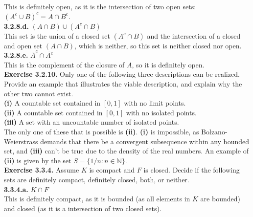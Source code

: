 \documentclass[12pt,letterpaper]{article}
\begin{document}
This is definitely open, as it is the intersection of two open sets: \((A^{c} \cup B)^{c} = A \cap B^{c}\). \\

\textbf{3.2.8.d.} \((A \cap B) \cup (A^{c} \cap B)\) \\

This set is the union of a closed set \((A^{c} \cap B)\) and the intersection of a closed and open set \((A \cap B)\), which is neither, so this set is neither closed nor open. \\

\textbf{3.2.8.e.} \(\overline{A}^{c} \cap \overline{A^{c}}\) \\

This is the complement of the closure of \(A\), so it is definitely open. \\

\textbf{Exercise 3.2.10.} Only one of the following three descriptions can be realized. Provide an example that illustrates the viable description, and explain why the other two cannot exist. \\

\textbf{(i)} A countable set contained in \([0,1]\) with no limit points. \\

\textbf{(ii)} A countable set contained in \([0,1]\) with no isolated points. \\

\textbf{(iii)} A set with an uncountable number of isolated points. \\

The only one of these that is possible is \textbf{(ii)}. \textbf{(i)} is impossible, as Bolzano-Weierstrass demands that there be a convergent subsequence within any bounded set, and \textbf{(iii)} can't be true due to the density of the real numbers. An example of \textbf{(ii)} is given by the set \(S = \{ 1/n: n \in \mathbb{N}\}\). \\

\textbf{Exercise 3.3.4.} Assume \(K\) is compact and \(F\) is closed. Decide if the following sets are definitely compact, definitely closed, both, or neither. \\ 

\textbf{3.3.4.a.} \(K \cap F\) \\

This is definitely compact, as it is bounded (as all elements in \(K\) are bounded) and closed (as it is a intersection of two closed sets). \\
\end{document}

